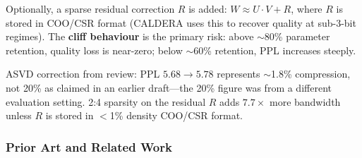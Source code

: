 \documentclass[11pt]{article}
\begin{document}
Optionally, a sparse residual correction $R$ is added: $W \approx U{\cdot}V + R$, where $R$ is stored in COO/CSR format (CALDERA \cite{BhattEtAl2024} uses this to recover quality at sub-3-bit regimes).
The \textbf{cliff behaviour} is the primary risk: above $\sim$80\% parameter retention, quality loss is near-zero; below $\sim$60\% retention, PPL increases steeply.

ASVD correction from review: PPL $5.68 \to 5.78$ represents $\sim$1.8\% compression, not 20\% as claimed in an earlier draft---the 20\% figure was from a different evaluation setting.
2:4 sparsity on the residual $R$ adds $7.7\times$ more bandwidth unless $R$ is stored in $<$1\% density COO/CSR format.

\subsubsection*{Prior Art and Related Work}
\end{document}
